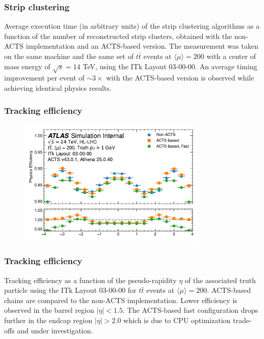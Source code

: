 \documentclass[aspectratio=169]{beamer}
\begin{document}
\begin{frame}
\frametitle{Strip clustering}
Average execution time (in arbitrary units) of the strip clustering algorithms as a function of the number of reconstructed strip clusters, obtained with the non-ACTS implementation and an ACTS-based version. The measurement was taken on the same machine and the same set of $t\bar{t}$ events at $\langle \mu \rangle = 200$ with a center of mass energy of $\sqrt{s}=14$ TeV, using the ITk Layout 03-00-00. An average timing improvement per event of $\sim3\times$ with the ACTS-based version is observed while achieving identical physics results.
\end{frame}


\begin{frame}
\frametitle{Tracking efficiency}
\begin{figure}[h]
    \centering
    \includegraphics[width=0.8\textwidth]{plots/tracking_efficiency_physics.pdf}
\end{figure}
\end{frame}

\begin{frame}
\frametitle{Tracking efficiency}
Tracking efficiency as a function of the pseudo-rapidity $\eta$ of the associated truth particle using the ITk Layout 03-00-00 for $t\bar{t}$ events at $\langle \mu \rangle = 200$. ACTS-based chains are compared to the non-ACTS implementation. Lower efficiency is observed in the barrel region $|\eta| < 1.5$. The ACTS-based fast configuration drops further in the endcap region $|\eta| > 2.0$ which is due to CPU optimization trade-offs and under investigation.
\end{frame}
\end{document}
